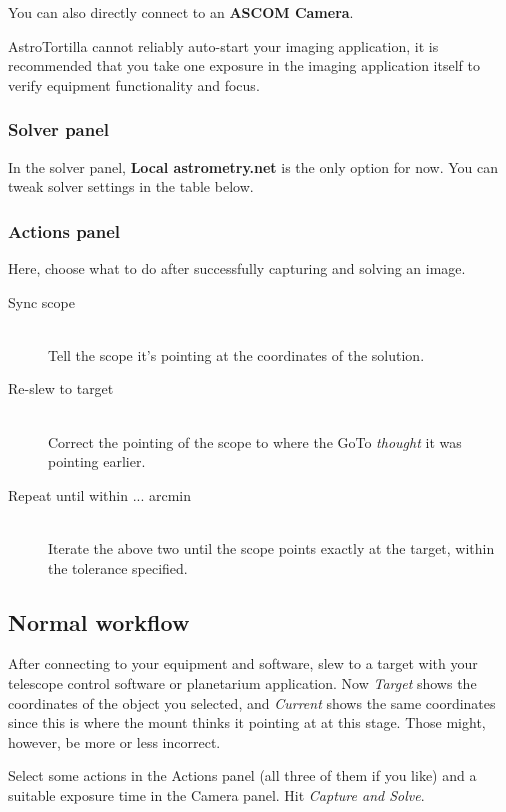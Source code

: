 \documentclass[english]{article}
\begin{document}
You can also directly connect to an \textbf{ASCOM Camera}.

AstroTortilla cannot reliably auto-start your imaging application, it is recommended that you take one exposure in the imaging application itself to verify equipment functionality and focus.

\subsubsection{Solver panel}

In the solver panel, \textbf{Local astrometry.net} is the only option for now. You can tweak solver settings in the table below.

\subsubsection{Actions panel}

Here, choose what to do after successfully capturing and solving an image.
\begin{description}
\item[Sync scope] \hfill \\
Tell the scope it's pointing at the coordinates of the solution.
\item[Re-slew to target] \hfill \\
Correct the pointing of the scope to where the GoTo \emph{thought} it was pointing earlier.
\item[Repeat until within ... arcmin] \hfill \\
Iterate the above two until the scope points exactly at the target, within the tolerance specified.
\end{description}

\subsection{Normal workflow}

After connecting to your equipment and software, slew to a target with your telescope control software or planetarium application.
Now \emph{Target} shows the coordinates of the object you selected, and \emph{Current} shows the same coordinates since this is
where the mount thinks it pointing at at this stage. Those might, however, be more or less incorrect.

Select some actions in the Actions panel (all three of them if you like) and a suitable 
exposure time in the Camera panel. Hit \emph{Capture and Solve}.
\end{document}
